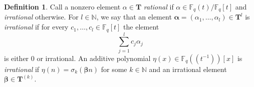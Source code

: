 \documentclass{amsart}
\theoremstyle{definition}
\newtheorem{definition}[theorem]{Definition}
\numberwithin{equation}{section}
\newcommand{\N}{\mathbb{N}}
\newcommand{\F}{\mathbb{F}}
\begin{document}
\begin{definition} \label{defn: irrational element}
    Call a nonzero element $\alpha \in \mathbf{T}$ \emph{rational} if $\alpha \in \F_q(t)/\F_q[t]$ and \emph{irrational} otherwise.
    For $l \in \N$, we say that an element $\bm{\alpha} = (\alpha_1, \ldots, \alpha_l) \in \mathbf{T}^l$ is \emph{irrational} if for every $c_1, \ldots, c_l \in \F_q[t]$ the element
    \begin{equation*}
        \sum_{j=1}^l c_j \alpha_j
    \end{equation*}
    is either $0$ or irrational.
    An additive polynomial $\eta(x) \in \F_q((t^{-1}))[x]$ is \emph{irrational} if $\eta(n) = \sigma_k(\bm{\beta} n)$ for some $k \in \N$ and an irrational element $\bm{\beta} \in \mathbf{T}^{(k)}$.
\end{definition}
\end{document}
